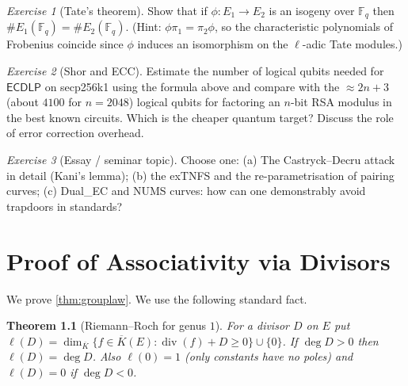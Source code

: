 \documentclass[11pt,a4paper,oneside]{book}
\theoremstyle{plain}
\newtheorem{theorem}{Theorem}[chapter]
\theoremstyle{definition}
\theoremstyle{remark}
\newtheorem{exercise}{Exercise}[chapter]
\newcommand{\Fq}{\mathbb{F}_q}
\newcommand{\Kbar}{\overline{K}}
\newcommand{\divv}{\operatorname{div}}
\newcommand{\ECDLP}{\mathsf{ECDLP}}
\begin{document}
\begin{exercise}[Tate's theorem]
Show that if $\phi:E_1\to E_2$ is an isogeny over $\Fq$ then $\#E_1(\Fq)=\#E_2(\Fq)$. (Hint: $\phi\pi_1=\pi_2\phi$, so the characteristic polynomials of Frobenius coincide since $\phi$ induces an isomorphism on the $\ell$-adic Tate modules.)
\end{exercise}

\begin{exercise}[Shor and ECC]
Estimate the number of logical qubits needed for $\ECDLP$ on secp256k1 using the formula above and compare with the $\approx 2n+3$ (about $4100$ for $n=2048$) logical qubits for factoring an $n$-bit RSA modulus in the best known circuits. Which is the cheaper quantum target? Discuss the role of error correction overhead.
\end{exercise}

\begin{exercise}[Essay / seminar topic]
Choose one: (a) The Castryck--Decru attack in detail (Kani's lemma); (b) the exTNFS and the re-parametrisation of pairing curves; (c) Dual\_EC and NUMS curves: how can one demonstrably avoid trapdoors in standards?
\end{exercise}
\appendix
\chapter{Proof of Associativity via Divisors}\label{app:associativity}

We prove \cref{thm:grouplaw}. We use the following standard fact.

\begin{theorem}[Riemann--Roch for genus $1$]
For a divisor $D$ on $E$ put $\ell(D)=\dim_{\Kbar}\{f\in\Kbar(E):\divv(f)+D\ge0\}\cup\{0\}$. If $\deg D>0$ then $\ell(D)=\deg D$. Also $\ell(0)=1$ (only constants have no poles) and $\ell(D)=0$ if $\deg D<0$.
\end{theorem}
\end{document}
